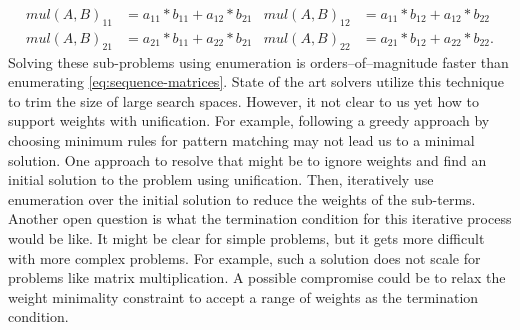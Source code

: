 \begin{description}
%
\begin{align*}
    mul(A,B)_{11} &= a_{11} * b_{11} + a_{12} * b_{21} &
    mul(A,B)_{12} &= a_{11} * b_{12} + a_{12} * b_{22} \\
    mul(A,B)_{21} &= a_{21} * b_{11} + a_{22} * b_{21} &
    mul(A,B)_{22} &= a_{21} * b_{12} + a_{22} * b_{22}. 
\end{align*}
%
Solving these sub-problems using enumeration is orders--of--magnitude faster than enumerating \eqref{eq:sequence-matrices}.
%
State of the art solvers utilize this technique to trim the size of large search spaces.
%
However, it not clear to us yet how to support weights with unification.
%
For example, following a greedy approach by choosing minimum rules for pattern matching may not lead us to a minimal solution.
%
One approach to resolve that might be to ignore weights and find an initial solution to the problem using unification.
%
Then, iteratively use enumeration over the initial solution to reduce the weights of the sub-terms.
%
Another open question is what the termination condition for this iterative process would be like.
%
It might be clear for simple problems, but it gets more difficult with more complex problems.
%
For example, such a solution does not scale for problems like matrix multiplication.
%
A possible compromise could be to relax the weight minimality constraint to accept a range of weights as the termination condition.
%
\end{description}